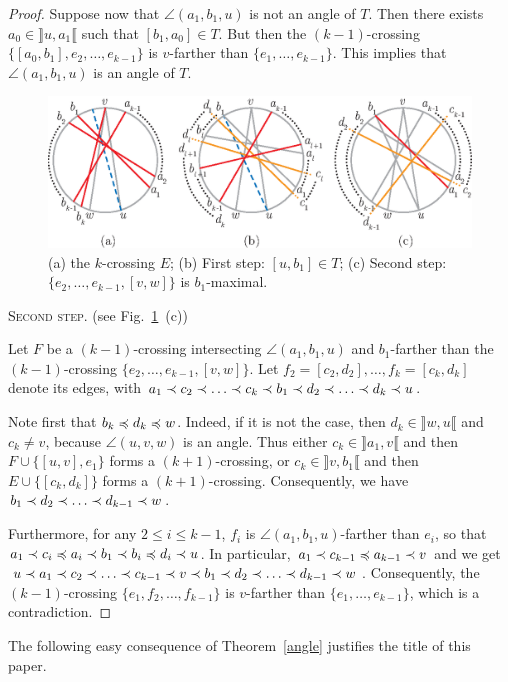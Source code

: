 \documentclass[12pt]{amsart}
\begin{document}
\begin{proof}
Suppose now that $\angle(a_1,b_1,u)$ is not an angle of $T$. Then there exists $a_0\in \rrbracket u,a_1\llbracket$ such that $[b_1,a_0]\in T$. But then the $(k-1)$-crossing $\{[a_0,b_1],e_2,\ldots,e_{k-1}\}$ is $v$-farther than $\{e_1,\ldots,e_{k-1}\}$. This implies that $\angle(a_1,b_1,u)$ is an angle of $T$.
\begin{figure}
\centerline{\includegraphics[scale=1]{twosteps.eps}}
\caption{\small{(a) the $k$-crossing $E$; (b) First step: $[u,b_1]\in T$; (c) Second step: $\{e_2,\ldots,e_{k-1},[v,w]\}$ is $b_1$-maximal.}}\label{twosteps}
\end{figure}

\medskip
\noindent\textsc{Second step.} (see Fig.~\ref{twosteps}~(c))

Let $F$ be a $(k-1)$-crossing intersecting $\angle(a_1,b_1,u)$ and $b_1$-farther than the $(k-1)$-crossing $\{e_2,\ldots,e_{k-1},[v,w]\}$. Let $f_2=[c_2,d_2],\ldots,f_k=[c_k,d_k]$ denote its edges, with $a_1\prec c_2\prec \ldots\prec c_k\prec b_1\prec d_2\prec \ldots\prec d_k\prec u$. 

Note first that $b_k\preccurlyeq d_k\preccurlyeq w$. Indeed, if it is not the case, then $d_k\in\rrbracket w,u\llbracket$ and $c_k\ne v$, because $\angle(u,v,w)$ is an angle. Thus either $c_k\in\rrbracket a_1,v\llbracket$ and then $F\cup\{[u,v],e_1\}$ forms a $(k+1)$-crossing, or $c_k\in\rrbracket v,b_1\llbracket$ and then $E\cup\{[c_k,d_k]\}$ forms a $(k+1)$-crossing. Consequently, we have $b_1\prec d_2\prec\ldots\prec d_{k-1}\prec w$.

Furthermore, for any $2\le i\le k-1$, $f_i$ is $\angle(a_1,b_1,u)$-farther than $e_i$, so that $a_1\prec c_i\preccurlyeq a_i\prec b_1\prec b_i\preccurlyeq d_i\prec u$. In particular, $a_1\prec c_{k-1}\preccurlyeq a_{k-1}\prec v$ and we get $u\prec a_1\prec c_2\prec\ldots\prec c_{k-1}\prec v\prec b_1\prec d_2\prec \ldots\prec d_{k-1}\prec w$. Consequently, the $(k-1)$-crossing $\{e_1,f_2,\ldots,f_{k-1}\}$ is $v$-farther than $\{e_1,\ldots,e_{k-1}\}$, which is a contradiction.
\end{proof}

The following easy consequence of Theorem~\ref{angle} justifies the title of this paper.
\end{document}
